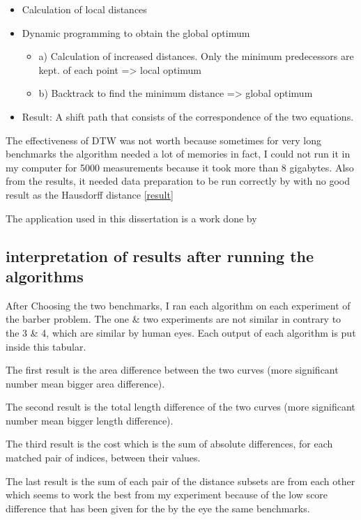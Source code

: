 \documentclass{article}
\begin{document}
\begin{itemize}
    \item Calculation of local distances
    \item Dynamic programming to obtain the global optimum \begin{itemize}
        \item a) Calculation of increased distances. Only the minimum predecessors are kept. of each point => local optimum
        \item b) Backtrack to find the minimum distance => global optimum
    \end{itemize}
    \item Result: A shift path that consists of the correspondence of the two equations.
\end{itemize}

The effectiveness of DTW was not worth because sometimes for very long benchmarks the algorithm needed a lot of memories in fact, I could not run it in my computer for 5000 measurements because it took more than 8 gigabytes.
Also from the results, it needed data preparation to be run correctly by with no good result as the Hausdorff distance \ref{result}

The application used in this dissertation is a work done by \citep{salvador2007toward}

\subsection{ interpretation of results after running the algorithms}

After Choosing the two benchmarks, I ran each algorithm on each experiment of the barber problem.
The one \& two experiments are not similar in contrary to the 3 \& 4, which are similar by human eyes.
Each output of each algorithm is put inside this tabular.


The first result is the area difference between the two curves (more significant number mean bigger area difference).

The second result is the total length difference of the two curves (more significant number mean bigger length difference).

The third result is the cost which is the sum of absolute differences, for each matched pair of indices, between their values.

The last result is the sum of each pair of the distance subsets are from each other which seems to work the best from my experiment because of the low score difference that has been given for the by the eye the same benchmarks.
\end{document}
